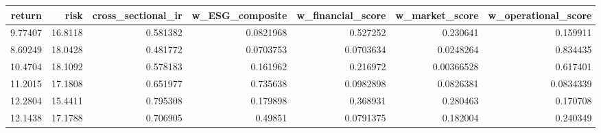 \begin{tabular}{rrrrrrr}
\toprule
return & risk & cross\_sectional\_ir & w\_ESG\_composite & w\_financial\_score & w\_market\_score & w\_operational\_score \\
\midrule
9.77407 & 16.8118 & 0.581382 & 0.0821968 & 0.527252 & 0.230641 & 0.159911 \\
8.69249 & 18.0428 & 0.481772 & 0.0703753 & 0.0703634 & 0.0248264 & 0.834435 \\
10.4704 & 18.1092 & 0.578183 & 0.161962 & 0.216972 & 0.00366528 & 0.617401 \\
11.2015 & 17.1808 & 0.651977 & 0.735638 & 0.0982898 & 0.0826381 & 0.0834339 \\
12.2804 & 15.4411 & 0.795308 & 0.179898 & 0.368931 & 0.280463 & 0.170708 \\
12.1438 & 17.1788 & 0.706905 & 0.49851 & 0.0791375 & 0.182004 & 0.240349 \\
\bottomrule
\end{tabular}
